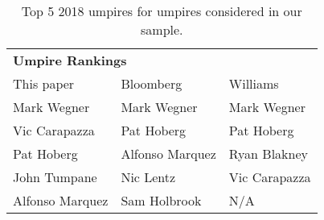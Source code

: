 \begin{table}
\centering\small
\begin{tabular}{lll}
\toprule
\multicolumn{3}{l}{\textbf{Umpire Rankings}}\\\addlinespace
                     This paper & Bloomberg \cite{ump-audit} &   Williams \cite{bu-umps} \\
\midrule
                          Mark Wegner &    Mark Wegner &  Mark Wegner  \\
                          Vic Carapazza &     Pat Hoberg &      Pat Hoberg \\
                        Pat Hoberg &     Alfonso Marquez &      Ryan Blakney  \\
                 John Tumpane &     Nic Lentz &      Vic Carapazza \\
                 Alfonso Marquez &     Sam Holbrook &      N/A\footnotemark \\
\bottomrule
\end{tabular}
\vspace{2mm}
\caption{Top 5 2018 umpires for umpires considered in our sample.}
\label{tab:ranks}
\end{table}
